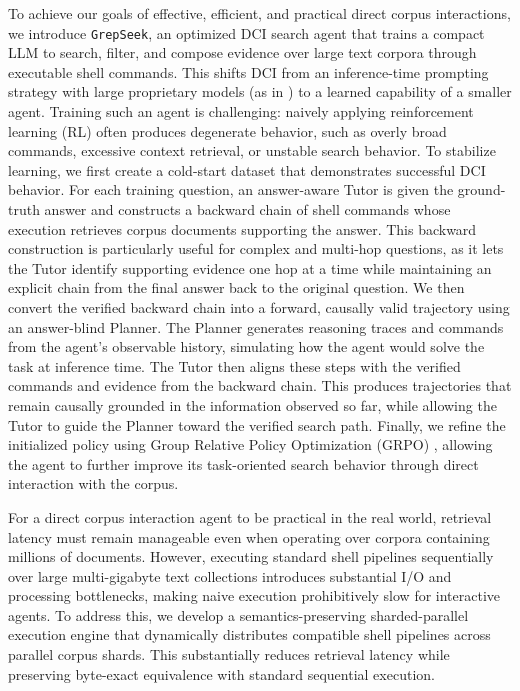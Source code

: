 \documentclass{article} %
\newcommand{\ourmethod}{\texttt{GrepSeek}\xspace}
\begin{document}
To achieve our goals of effective, efficient, and practical direct corpus interactions, we introduce \ourmethod{}, an optimized DCI search agent that trains a compact LLM to search, filter, and compose evidence over large text corpora through executable shell commands. This shifts DCI from an inference-time prompting strategy with large proprietary models (as in \citep{dci-agent}) to a learned capability of a smaller agent. Training such an agent is challenging: naively applying reinforcement learning (RL) often produces degenerate behavior, such as overly broad commands, excessive context retrieval, or unstable search behavior. To stabilize learning, we first create a cold-start dataset that demonstrates successful DCI behavior. For each training question, an answer-aware Tutor is given the ground-truth answer and constructs a backward chain of shell commands whose execution retrieves corpus documents supporting the answer. This backward construction is particularly useful for complex and multi-hop questions, as it lets the Tutor identify supporting evidence one hop at a time while maintaining an explicit chain from the final answer back to the original question. We then convert the verified backward chain into a forward, causally valid trajectory using an answer-blind Planner. The Planner generates reasoning traces and commands from the agent's observable history, simulating how the agent would solve the task at inference time. The Tutor then aligns these steps with the verified commands and evidence from the backward chain. This produces trajectories that remain causally grounded in the information observed so far, while allowing the Tutor to guide the Planner toward the verified search path. Finally, we refine the initialized policy using Group Relative Policy Optimization (GRPO) \citep{grpo}, allowing the agent to further improve its task-oriented search behavior through direct interaction with the corpus.



For a direct corpus interaction agent to be practical in the real world, retrieval latency must remain manageable even when operating over corpora containing millions of documents. However, executing standard shell pipelines sequentially over large multi-gigabyte text collections introduces substantial I/O and processing bottlenecks, making naive execution prohibitively slow for interactive agents. To address this, we develop a semantics-preserving sharded-parallel execution engine that dynamically distributes compatible shell pipelines across parallel corpus shards. This substantially reduces retrieval latency while preserving byte-exact equivalence with standard sequential execution.
\end{document}

